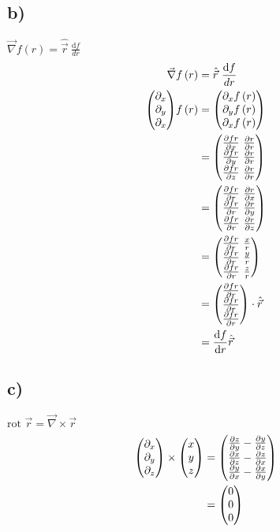 \documentclass{theozettel}
\begin{document}
\subsection*{b)}$\vec{\nabla}f\left(r\right)=\hat{\vec{r}} \ \frac{\text{d}f}{dr}$
\begin{align*}
\vec{\nabla}f\left(r\right)&=\hat{\vec{r}} \ \frac{\text{d}f}{dr}\\
\mqty(\partial_x\\\partial_y \\\partial_x  )f\left(r\right)&=\mqty(\partial_xf\left(r\right)\\\partial_yf\left(r\right) \\\partial_xf\left(r\right)  )\\
&=\mqty(\frac{\partial fr}{\partial x} \ \frac{\partial r}{\partial r}\\\frac{\partial fr}{\partial y} \ \frac{\partial r}{\partial r}\\\frac{\partial fr}{\partial z} \ \frac{\partial r}{\partial r})\\
&=\mqty(\frac{\partial fr}{\partial r} \ \frac{\partial r}{\partial x}\\\frac{\partial fr}{\partial r} \ \frac{\partial r}{\partial y}\\\frac{\partial fr}{\partial r} \ \frac{\partial r}{\partial z})\\
&=\mqty(\frac{\partial fr}{\partial r} \ \frac{x}{r}\\\frac{\partial fr}{\partial r} \ \frac{y}{r}\\\frac{\partial fr}{\partial r} \ \frac{z}{r})\\
&=\mqty(\frac{\partial fr}{\partial r} \\\frac{\partial fr}{\partial r} \\\frac{\partial fr}{\partial r})\cdot \hat{\vec{r}}\\
&=\frac{\text{d}f}{\text{d}r}\hat{\vec{r}}
\end{align*}
\subsection*{c)}$\text{rot }\vec{r}=\vec{\nabla}\times\vec{r}$
\begin{align*}
\mqty(\partial_x\\\partial_y\\\partial_z)\times\mqty(x\\y\\z)&=\mqty(\frac{\partial z}{\partial y}-\frac{\partial y}{\partial z}\\\frac{\partial x}{\partial z}-\frac{\partial z}{\partial x}\\\frac{\partial y}{\partial x}-\frac{\partial x}{\partial y})\\
&=\mqty(0\\0\\0)
\end{align*}
\end{document}
